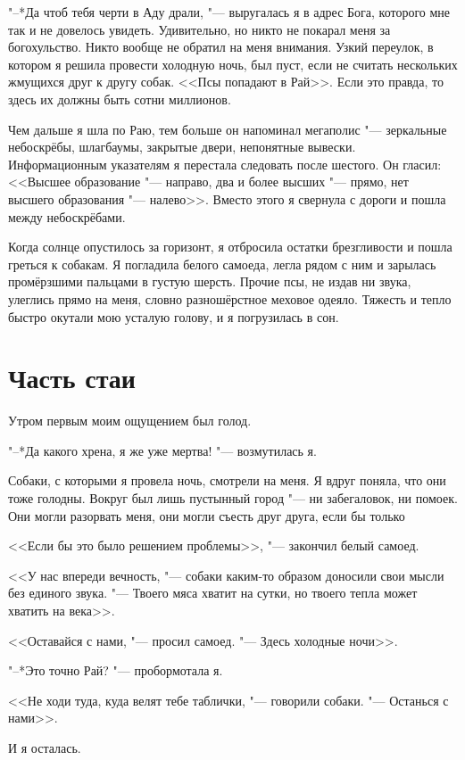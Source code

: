 "--*Да чтоб тебя черти в Аду драли, "--- выругалась я в адрес Бога, которого мне так и не довелось увидеть.
Удивительно, но никто не покарал меня за богохульство.
Никто вообще не обратил на меня внимания.
Узкий переулок, в котором я решила провести холодную ночь, был пуст, если не считать нескольких жмущихся друг к другу собак.
<<Псы попадают в Рай>>.
Если это правда, то здесь их должны быть сотни миллионов.

Чем дальше я шла по Раю, тем больше он напоминал мегаполис "--- зеркальные небоскрёбы, шлагбаумы, закрытые двери, непонятные вывески.
Информационным указателям я перестала следовать после шестого.
Он гласил: <<Высшее образование "--- направо, два и более высших "--- прямо, нет высшего образования "--- налево>>.
Вместо этого я свернула с дороги и пошла между небоскрёбами.

Когда солнце опустилось за горизонт, я отбросила остатки брезгливости и пошла греться к собакам.
Я погладила белого самоеда, легла рядом с ним и зарылась промёрзшими пальцами в густую шерсть.
Прочие псы, не издав ни звука, улеглись прямо на меня, словно разношёрстное меховое одеяло.
Тяжесть и тепло быстро окутали мою усталую голову, и я погрузилась в сон.

\section{Часть стаи}

Утром первым моим ощущением был голод.

"--*Да какого хрена, я же уже мертва! "--- возмутилась я.

Собаки, с которыми я провела ночь, смотрели на меня.
Я вдруг поняла, что они тоже голодны.
Вокруг был лишь пустынный город "--- ни забегаловок, ни помоек.
Они могли разорвать меня, они могли съесть друг друга, если бы только\ldotst

<<Если бы это было решением проблемы>>, "--- закончил белый самоед.

<<У нас впереди вечность, "--- собаки каким-то образом доносили свои мысли без единого звука.
"--- Твоего мяса хватит на сутки, но твоего тепла может хватить на века>>.

<<Оставайся с нами, "--- просил самоед.
"--- Здесь холодные ночи>>.

"--*Это точно Рай? "--- пробормотала я.

<<Не ходи туда, куда велят тебе таблички, "--- говорили собаки.
"--- Останься с нами>>.

И я осталась.

